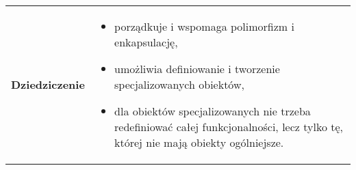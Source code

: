 \documentclass[../main.tex]{subfiles}
\begin{document}
\begin{table}[H]
\begin{center}
\begin{tabular}{  p{3cm} p{12cm}  }
                \textbf{Dziedziczenie}
                &
                \begin{itemize}
                    \item porządkuje i wspomaga polimorfizm i enkapsulację,
                    \item umożliwia definiowanie i tworzenie specjalizowanych obiektów,
                    \item dla obiektów specjalizowanych nie trzeba redefiniować całej funkcjonalności, lecz tylko tę,
                    której nie mają obiekty ogólniejsze.
                \end{itemize}
            \end{tabular}
        \end{center}
    \end{table}
\end{document}

